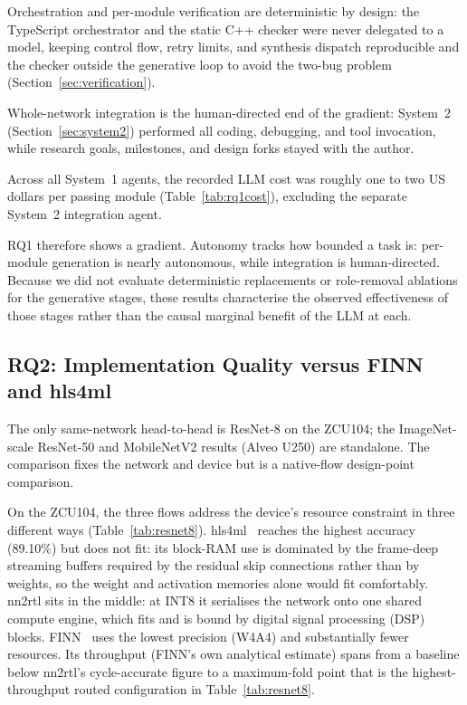 \documentclass[acmtog,authorversion]{acmart}
\begin{document}
Orchestration and per-module verification are deterministic by design: the TypeScript orchestrator and the static C++ checker were never delegated to a model, keeping control flow, retry limits, and synthesis dispatch reproducible and the checker outside the generative loop to avoid the two-bug problem (Section~\ref{sec:verification}).

Whole-network integration is the human-directed end of the gradient: System~2 (Section~\ref{sec:system2}) performed all coding, debugging, and tool invocation, while research goals, milestones, and design forks stayed with the author.

Across all System~1 agents, the recorded LLM cost was roughly one to two US dollars per passing module (Table~\ref{tab:rq1cost}), excluding the separate System~2 integration agent.

RQ1 therefore shows a gradient. Autonomy tracks how bounded a task is: per-module generation is nearly autonomous, while integration is human-directed. Because we did not evaluate deterministic replacements or role-removal ablations for the generative stages, these results characterise the observed effectiveness of those stages rather than the causal marginal benefit of the LLM at each.

\subsection{RQ2: Implementation Quality versus FINN and hls4ml}\label{sec:rq2}

The only same-network head-to-head is ResNet-8 on the ZCU104; the ImageNet-scale ResNet-50 and MobileNetV2 results (Alveo U250) are standalone. The comparison fixes the network and device but is a native-flow design-point comparison.

On the ZCU104, the three flows address the device's resource constraint in three different ways (Table~\ref{tab:resnet8}). hls4ml~\cite{schulte2026hls4ml, duarte2018hls4ml} reaches the highest accuracy (89.10\%) but does not fit: its block-RAM use is dominated by the frame-deep streaming buffers required by the residual skip connections rather than by weights, so the weight and activation memories alone would fit comfortably. nn2rtl sits in the middle: at INT8 it serialises the network onto one shared compute engine, which fits and is bound by digital signal processing (DSP) blocks. FINN~\cite{umuroglu2017finn, blott2018finnr} uses the lowest precision (W4A4) and substantially fewer resources. Its throughput (FINN's own analytical estimate) spans from a baseline below nn2rtl's cycle-accurate figure to a maximum-fold point that is the highest-throughput routed configuration in Table~\ref{tab:resnet8}.
\end{document}
